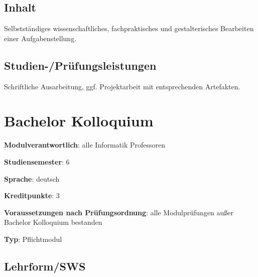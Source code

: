 \section*{Inhalt\label{/mi-2017/modulbeschreibungen-bachelor/BA_Bachelorarbeit}}\label{inhaltpathlabelmi-2017modulbeschreibungen-bachelorbaux5fbachelorarbeit}

Selbstständiges wissenschaftliches, fachpraktisches und gestalterisches
Bearbeiten einer Aufgabenstellung.

\section*{Studien-/Prüfungsleistungen\label{/mi-2017/modulbeschreibungen-bachelor/BA_Bachelorarbeit}}\label{studien-pruxfcfungsleistungenpathlabelmi-2017modulbeschreibungen-bachelorbaux5fbachelorarbeit}

Schriftliche Ausarbeitung, ggf. Projektarbeit mit entsprechenden
Artefakten.

\chapter{Bachelor
Kolloquium\label{/mi-2017/modulbeschreibungen-bachelor/BA_Bachelorkolloquium}}\label{bachelor-kolloquiumpathlabelmi-2017modulbeschreibungen-bachelorbaux5fbachelorkolloquium}

\begin{modulHead}
\textbf{Modulverantwortlich}: alle Informatik
Professoren
\end{modulHead}
\begin{modulHead}
\textbf{Studiensemester}:
6
\end{modulHead}
\begin{modulHead}
\textbf{Sprache}:
deutsch
\end{modulHead}
\begin{modulHead}
\textbf{Kreditpunkte}:
3
\end{modulHead}
\begin{modulHead}
\textbf{Voraussetzungen nach
Prüfungsordnung}: alle Modulprüfungen außer Bachelor Kolloquium
bestanden
\end{modulHead}
\begin{modulHead}
\textbf{Typ}:
Pflichtmodul
\end{modulHead}


\section*{Lehrform/SWS\label{/mi-2017/modulbeschreibungen-bachelor/BA_Bachelorkolloquium}}\label{lehrformswspathlabelmi-2017modulbeschreibungen-bachelorbaux5fbachelorkolloquium}

